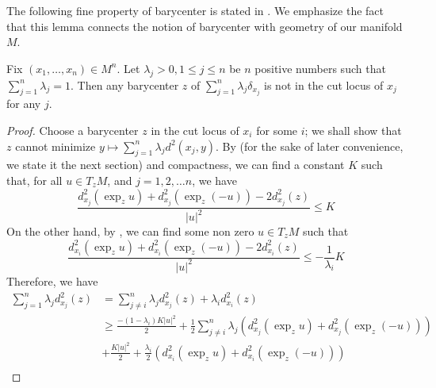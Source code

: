 The following fine property of barycenter is stated in \cite[Lemma 3.1]{kim2015multi}.
We emphasize the fact that this lemma connects the notion of barycenter with geometry of our manifold $M$.
\begin{lem}
	\label{lem:barycenter_out_of_cut_locus}
	Fix \( \left( x _ { 1 } , \ldots , x _ { n } \right) \in M^n\).
	Let $\lambda_j >0, 1 \leq j \leq n$ be $n$ positive numbers such that
	$\sum_{j=1}^n \lambda_j =1$.
	Then any barycenter $z$ of $\sum_{j=1}^n \lambda_j \delta_{x_j}$
	is not in the cut locus of \( x _ { j } \) for any \( j . \)
\end{lem}

\begin{proof}
	Choose a barycenter \( z \) in the cut locus of \( x _ { i } \) for some \( i \);
	we shall show that \( z \) cannot minimize
	\( y \mapsto \sum _ { j = 1 } ^ { n } \lambda_j d ^ { 2 } \left( x _ { j } , y \right) \).
	By  (for the sake of later convenience, we state it the next section) and compactness,
	we can find a constant \( K \) such that, for all \( u \in T _ { z } M \),
	and \( j = 1,2 , \ldots n \), we have
	\[
		\frac { d ^ { 2 }_{x _ { j } } \left(  \exp _ { z } u \right) + d ^ { 2 }_{x _ { j } } \left( \exp _ { z } ( - u ) \right) - 2 d ^ { 2 }_{ x_j} \left( z \right) }
		{ | u | ^ { 2 } } \leq K
	\]
	On the other hand, by ,
	we can find some non
	zero \( u \in T _ { z } M \) such that
	\[
		\frac { d ^ { 2 }_{x _ { i } } \left(  \exp _ { z } u \right) + d ^ { 2 }_{x _ { i } } \left( \exp _ { z } ( - u ) \right) - 2 d ^ { 2 }_{ x_i} \left( z \right) }
		{ | u | ^ { 2 } } \leq - \frac{1}{\lambda_i} K
	\]
	Therefore, we have
	\begin{align*}
	\sum _ { j = 1 } ^ { n } \lambda_j d ^ { 2 }_{ x _ { j } }( z ) & =
\sum _ { j \neq i } ^ { n } \lambda_j d ^ { 2 }_{ x _ { j } }(z ) + \lambda_i d ^ { 2 } _ { x _ { i } } \left( z \right) \\
											  & \geq \frac { - ( 1 - \lambda_i ) K | u | ^ { 2 } } { 2 } +
											  \frac { 1 } { 2 } \sum _ { j \neq i } ^ { n } \lambda_j \left( d ^ { 2 } _{ x _ { j } }( \exp _ { z } u ) +
									  d ^ { 2 } _{ x _ { j }} \left( \exp _ { z } ( - u ) \right) \right) \\
											  & + \frac { K | u | ^ { 2 } } { 2 } + \frac { \lambda_i } { 2 }
											  \left( d ^ { 2 } _{ x _ { i }} \left( \exp _ { z } u \right) +
											  d ^ { 2 } _{ x _ { i }} \left( \exp _ { z } ( - u ) \right)  \right)                                                       \\

\end{align*}
\end{proof}
